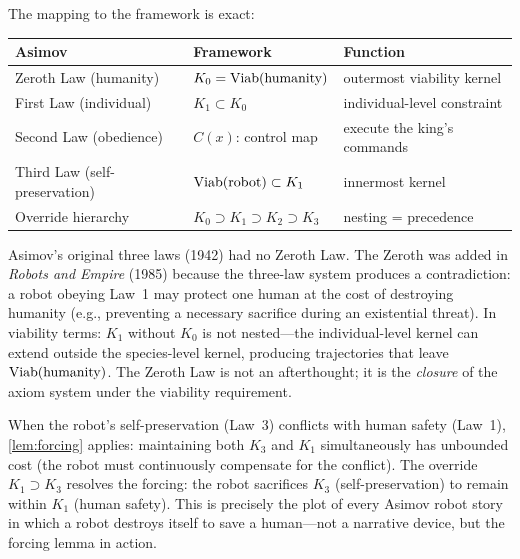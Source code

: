 The mapping to the framework is exact:

\begin{center}
\renewcommand{\arraystretch}{1.25}
\begin{tabular}{@{}lll@{}}
\toprule
\textbf{Asimov} & \textbf{Framework} & \textbf{Function} \\
\midrule
Zeroth Law (humanity) & $K_0 = \mathrm{Viab}(\text{humanity})$
  & outermost viability kernel \\
First Law (individual) & $K_1 \subset K_0$
  & individual-level constraint \\
Second Law (obedience) & $C(x)$: control map
  & execute the king's commands \\
Third Law (self-preservation) & $\mathrm{Viab}(\text{robot}) \subset K_1$
  & innermost kernel \\
Override hierarchy & $K_0 \supset K_1 \supset K_2 \supset K_3$
  & nesting = precedence \\
\bottomrule
\end{tabular}
\end{center}

\begin{remark}
\label{rem:zeroth-law}
Asimov's original three laws (1942) had no Zeroth Law.  The
Zeroth was added in \emph{Robots and Empire} (1985) because the
three-law system produces a contradiction: a robot obeying
Law~1 may protect one human at the cost of destroying humanity
(e.g., preventing a necessary sacrifice during an existential
threat).  In viability terms: $K_1$ without $K_0$ is not
nested---the individual-level kernel can extend outside the
species-level kernel, producing trajectories that leave
$\mathrm{Viab}(\text{humanity})$.  The Zeroth Law is not an
afterthought; it is the \emph{closure} of the axiom system
under the viability requirement.
\end{remark}

\begin{remark}
\label{rem:asimov-forcing}
When the robot's self-preservation (Law~3) conflicts with
human safety (Law~1), \cref{lem:forcing} applies: maintaining
both $K_3$ and $K_1$ simultaneously has unbounded cost (the
robot must continuously compensate for the conflict).  The
override $K_1 \supset K_3$ resolves the forcing: the robot
sacrifices $K_3$ (self-preservation) to remain within $K_1$
(human safety).  This is precisely the plot of every Asimov
robot story in which a robot destroys itself to save a
human---not a narrative device, but the forcing lemma in action.
\end{remark}

